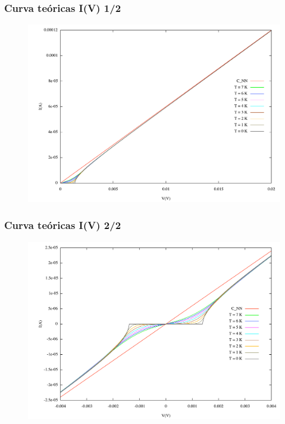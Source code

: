 \begin{frame}
\end{frame}
\begin{frame}
\frametitle{Curva te\'oricas I(V) 1/2}

\begin{figure}[!h] \label{iv_teorico}
\includegraphics[width=\textwidth]{iv_teorico}
\end{figure}
	
\end{frame}
\begin{frame}
\frametitle{Curva te\'oricas I(V) 2/2}

\begin{figure}[!h] \label{iv_teorico2}
\includegraphics[width=\textwidth]{iv_teorico2}
\end{figure}

\end{frame}
